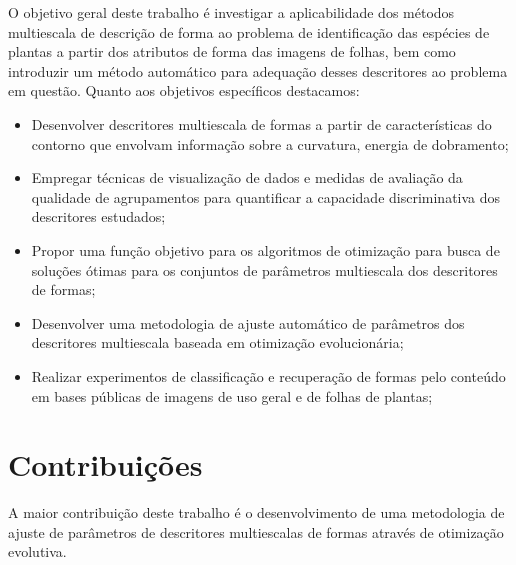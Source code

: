 

O objetivo geral deste trabalho é investigar a aplicabilidade dos métodos multiescala de descrição de forma ao problema de identificação das espécies de plantas a partir dos atributos de forma das imagens de folhas, bem como introduzir um método automático para adequação desses descritores ao problema em questão. Quanto aos objetivos específicos destacamos:

\begin{itemize}
\item Desenvolver descritores multiescala de formas a partir de características do contorno que envolvam informação sobre a curvatura, energia de dobramento;

\item Empregar técnicas de visualização de dados e medidas de avaliação da qualidade de agrupamentos para quantificar a capacidade discriminativa dos descritores estudados; 

\item Propor uma função objetivo para os algoritmos de otimização para busca de soluções ótimas para os conjuntos de parâmetros multiescala dos descritores de formas;

\item Desenvolver uma metodologia de ajuste automático de parâmetros dos descritores multiescala baseada em otimização evolucionária;

\item Realizar experimentos de classificação e recuperação de formas pelo conteúdo em bases públicas de imagens de uso geral e de folhas de plantas;

\end{itemize}


\section{Contribuições \label{sec:contrib}}

A maior contribuição deste trabalho é o desenvolvimento de uma metodologia de ajuste de parâmetros de descritores multiescalas de formas através de otimização evolutiva.


